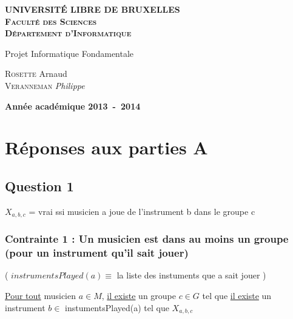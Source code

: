 \documentclass[a4paper,10pt]{report}
\begin{document}
\begin{titlepage}
    \begin{center}
        \textbf{\textsc{UNIVERSIT\'E LIBRE DE BRUXELLES}}\\
        \textbf{\textsc{Faculté des Sciences}}\\
        \textbf{\textsc{Département d'Informatique}}

        \vfill{}\vfill{}

        \begin{center}
            \Huge{Projet Informatique Fondamentale}
        \end{center}
        \Huge{\par}
        \begin{center}
            \large{
                \textsc{Rosette} Arnaud \\
                \textsc{Veranneman} \it{Philippe}
            }
        \end{center}
        \Huge{\par}

        \vfill{}\vfill{}

        \vfill{}\vfill{}\enlargethispage{3cm}

        \textbf{Année académique 2013~-~2014}
    \end{center}
\end{titlepage}


\tableofcontents
\pagebreak

\section{Réponses aux parties A}

\subsection{Question 1}

$X_{a,b,c}$ = vrai ssi musicien a joue de l'instrument b dans le groupe c

\subsubsection{Contrainte 1 : Un musicien est dans au moins un groupe (pour un instrument qu'il sait jouer)}


( $instrumentsPlayed(a) \equiv$ la liste des instuments que a sait jouer )


\underline{Pour tout} musicien $a \in M $, \underline{il existe} un groupe $c \in G$ tel que \underline{il existe} un instrument $b \in$ instumentsPlayed(a)  tel que $X_{a,b,c}$
\end{document}
